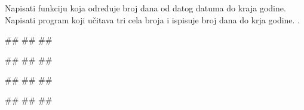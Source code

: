 \begin{Exercise}[label=do_kraja_godine] 
Napisati funkciju  koja određuje broj dana od datog datuma do kraja
godine. Napisati program koji učitava tri cela broja i ispisuje broj
dana do krja godine. .

\begin{miditest}
\begin{upotreba}{1}
#\naslovInt#
##
##
\end{upotreba}
\end{miditest}
\begin{miditest}
\begin{upotreba}{2}
#\naslovInt#
##
##
\end{upotreba}
\end{miditest}

\begin{miditest}
\begin{upotreba}{3}
#\naslovInt#
##
##
\end{upotreba}
\end{miditest}
\begin{miditest}
\begin{upotreba}{4}
#\naslovInt#
##
##
\end{upotreba}
\end{miditest}

 
\end{Exercise}

